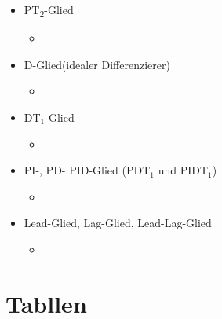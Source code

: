 \documentclass[margin=normal]{tex/hsrzf}
\begin{document}
\begin{itemize}
\begin{itemize}
                  \item PT\textsubscript{2}-Glied
                        \begin{itemize}
                              \item %
                        \end{itemize}
                  \item D-Glied(idealer Differenzierer)
                        \begin{itemize}
                              \item %
                        \end{itemize}
                  \item DT$_1$-Glied
                        \begin{itemize}
                              \item %
                        \end{itemize}
                  \item PI-, PD- PID-Glied (PDT$_1$ und PIDT$_1$)
                        \begin{itemize}
                              \item %
                        \end{itemize}
                  \item Lead-Glied, Lag-Glied, Lead-Lag-Glied
                        \begin{itemize}
                              \item %
                        \end{itemize}

            \end{itemize}
\end{itemize}




\section{Tabllen}
\end{document}
